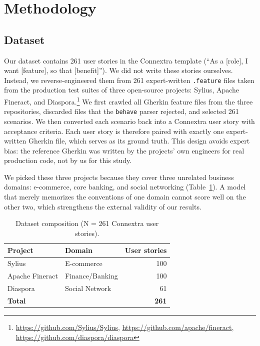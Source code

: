 
\section{Methodology}
\label{sec:method}

\subsection{Dataset}
\label{sec:dataset}

Our dataset contains 261 user stories in the Connextra template
(``As a [role], I want [feature], so that [benefit]''). We did not write
these stories ourselves. Instead, we reverse-engineered them from 261
expert-written \texttt{.feature} files taken from the production test
suites of three open-source projects: Sylius, Apache
Fineract, and Diaspora.\footnote{\url{https://github.com/Sylius/Sylius},
\url{https://github.com/apache/fineract},
\url{https://github.com/diaspora/diaspora}} We first crawled all Gherkin
feature files from the three repositories, discarded files that the
\texttt{behave} parser rejected, and selected 261 scenarios. We then
converted each scenario back into a Connextra user story with acceptance
criteria. Each user story is therefore paired with exactly one
expert-written Gherkin file, which serves as its ground truth. This
design avoids expert bias: the reference Gherkin was written by the
projects' own engineers for real production code, not by us for this
study.

We picked these three projects because they cover three unrelated
business domains: e-commerce, core banking, and social networking
(Table~\ref{tab:dataset}). A model that merely memorizes the
conventions of one domain cannot score well on the other two, which
strengthens the external validity of our results.

\begin{table}[t]
\caption{Dataset composition (N = 261 Connextra user stories).}
\label{tab:dataset}
\centering
\begin{tabular}{llr}
\toprule
\textbf{Project} & \textbf{Domain} & \textbf{User stories} \\
\midrule
Sylius           & E-commerce        & 100 \\
Apache Fineract  & Finance/Banking   & 100 \\
Diaspora         & Social Network    & 61  \\
\midrule
\textbf{Total}   &                   & \textbf{261} \\
\bottomrule
\end{tabular}
\end{table}

